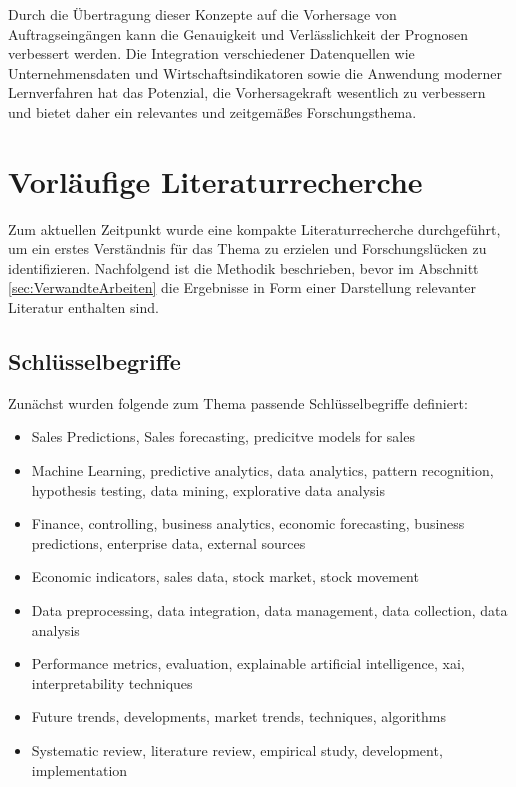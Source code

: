 \documentclass[lettersize,journal]{IEEEtran}
\begin{document}
Durch die Übertragung dieser Konzepte auf die Vorhersage von Auftragseingängen kann die Genauigkeit und Verlässlichkeit der Prognosen verbessert werden. Die Integration verschiedener Datenquellen wie Unternehmensdaten und Wirtschaftsindikatoren sowie die Anwendung moderner Lernverfahren hat das Potenzial, die Vorhersagekraft wesentlich zu verbessern und bietet daher ein relevantes und zeitgemäßes Forschungsthema. 




\section{Vorläufige Literaturrecherche}
Zum aktuellen Zeitpunkt wurde eine kompakte Literaturrecherche durchgeführt, um ein erstes Verständnis für das Thema zu erzielen und Forschungslücken zu identifizieren. Nachfolgend ist die Methodik beschrieben, bevor im Abschnitt \ref{sec:VerwandteArbeiten} die Ergebnisse in Form einer Darstellung relevanter Literatur enthalten sind.

\subsection{Schlüsselbegriffe}
Zunächst wurden folgende zum Thema passende Schlüsselbegriffe definiert:

\begin{itemize}
  \item Sales Predictions, Sales forecasting, predicitve models for sales
  \item Machine Learning, predictive analytics, data analytics, pattern recognition, hypothesis testing, data mining, explorative data analysis
  \item Finance, controlling, business analytics, economic forecasting, business predictions, enterprise data, external sources
  \item Economic indicators, sales data, stock market, stock movement
  \item Data preprocessing, data integration, data management, data collection, data analysis
  \item Performance metrics, evaluation, explainable artificial intelligence, xai, interpretability techniques
  \item Future trends, developments, market trends, techniques, algorithms
  \item Systematic review, literature review, empirical study, development, implementation
\end{itemize}
\end{document}
